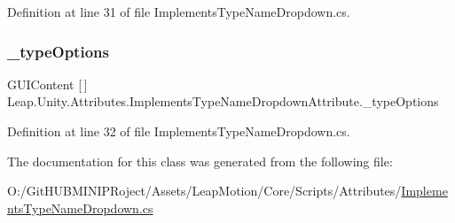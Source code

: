 Definition at line 31 of file Implements\+Type\+Name\+Dropdown.\+cs.

\mbox{\label{class_leap_1_1_unity_1_1_attributes_1_1_implements_type_name_dropdown_attribute_ae51a3dabf9bf7ec098a2ccf47cdd8106}} 
\subsubsection{\texorpdfstring{\_typeOptions}{\_typeOptions}}
{\footnotesize\ttfamily G\+U\+I\+Content \mbox{[}$\,$\mbox{]} Leap.\+Unity.\+Attributes.\+Implements\+Type\+Name\+Dropdown\+Attribute.\+\_\+type\+Options\hspace{0.3cm}{\ttfamily [protected]}}



Definition at line 32 of file Implements\+Type\+Name\+Dropdown.\+cs.



The documentation for this class was generated from the following file\+:\begin{DoxyCompactItemize}
\item 
O\+:/\+Git\+H\+U\+B\+M\+I\+N\+I\+P\+Roject/\+Assets/\+Leap\+Motion/\+Core/\+Scripts/\+Attributes/\mbox{\hyperlink{_implements_type_name_dropdown_8cs}{Implements\+Type\+Name\+Dropdown.\+cs}}\end{DoxyCompactItemize}
